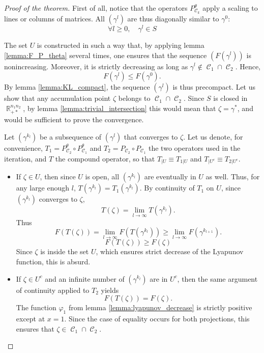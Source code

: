 \documentclass{article} %
\DeclareMathOperator{\IR}{\mathbb{R}}
\DeclareMathOperator{\Ccal}{\mathcal{C}}
\theoremstyle{plain}
\theoremstyle{definition}
\theoremstyle{remark}
\begin{document}
\begin{proof}[Proof of the theorem]
	First of all, notice that the operators $P_{\Ccal_k}^\theta$ apply a scaling to lines or columns of matrices. All $(\gamma^l)$ are thus diagonally similar to $\gamma^0$:
	\[
	\forall l\ge0,\quad \gamma^l \in S
	\]
	
	The set $U$ is constructed in such a way that, by applying lemma \ref{lemma:F_P_theta} several times, one ensures that the sequence $(F(\gamma^l))$ is nonincreasing. Moreover, it is strictly decreasing as long as $\gamma^l \not \in \Ccal_1 \cap \Ccal_2$.
	Hence, 
	\[
	F(\gamma^l) \le F(\gamma^0).
	\]
	By lemma \ref{lemma:KL_compact}, the sequence $(\gamma^l)$ is thus precompact. Let us show that any accumulation point $\zeta$ belongs to $\Ccal_1 \cap \Ccal_2$. Since $S$ is closed in $\IR_{+*}^{n_1 n_2}$, by lemma \ref{lemma:trivial_intersection} this would mean that $\zeta = \gamma^*$, and would be sufficient to prove the convergence.
	
	Let $(\gamma^{k_l})$ be a subsequence of $(\gamma^l)$ that converges to $\zeta$.
	Let us denote, for convenience, $T_1 = P_{\Ccal_2}^\theta \circ P_{\Ccal_1}^\theta$ and $T_2 = P_{\Ccal_2} \circ P_{\Ccal_1}$ the two operators used in the iteration, and $T$ the compound operator, so that $T_{|U} \equiv T_{1|U}$ and $T_{|U^c} \equiv T_{2|U^c}$.
	\begin{itemize}
		\item If $\zeta \in U$, then since $U$ is open, all $(\gamma^{k_l})$ are eventually in $U$ as well.
		Thus, for any large enough $l$, $ T(\gamma^{k_l}) = T_1(\gamma^{k_l}) $. By continuity of $T_1$ on $U$, since $(\gamma^{k_l})$ converges to $\zeta$, 
		\[T(\zeta) = \lim_{l\rightarrow \infty} T(\gamma^{k_l}).\] Thus
		 \[F(T(\zeta)) = \lim_{l \rightarrow \infty} F(T(\gamma^{k_l})) \ge \lim_{l\rightarrow \infty} F(\gamma^{k_{l+1}}) .\]
		 \[
		 F(T(\zeta)) \ge F(\zeta)
		 \] Since $\zeta$ is inside the set $U$, which ensures strict decrease of the Lyapunov function, this is absurd.
		 \item If $\zeta \in U^c$ and an infinite number of $(\gamma^{k_l})$ are in $U^c$, then the same argument of continuity applied to $T_2$ yields
		 \[
		 F(T(\zeta)) = F(\zeta).
		 \]
		 The function $\varphi_1$ from lemma \ref{lemma:lyapunov_decrease} is strictly positive except at $x=1$. Since the case of equality occurs for both projections, this ensures that $\zeta \in \Ccal_1 \cap \Ccal_2$.
		 

\end{itemize}
\end{proof}
\end{document}
